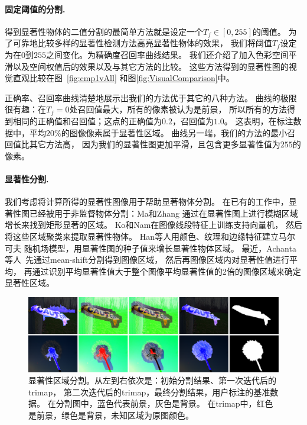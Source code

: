 \documentclass[final]{cvpr}
\newcommand{\mypara}[1]{\paragraph{#1.}}
\begin{document}

\mypara{固定阈值的分割}
得到显著性物体的二值分割的最简单方法就是设定一个$T_f \in [0, 255]$的阈值。
为了可靠地比较多样的显著性检测方法高亮显著性物体的效果，
我们将阈值$T_f$设定为在$0$到$255$之间变化。为精确度召回率曲线结果。
我们还介绍了加入色彩空间平滑以及空间权值后的效果以及与其它方法的比较。
这些方法得到的显著性图的视觉直观比较在图~\ref{fig:cmp1vAll}
和图\ref{fig:VisualComparison}中。

正确率、召回率曲线清楚地展示出我们的方法优于其它的八种方法。
曲线的极限很有趣：在$T_f=0$处召回值最大，所有的像素被认为是前景，
所以所有的方法得到相同的正确值和召回值；这点的正确值为$0.2$，召回值为$1.0$。
这表明，在标注数据中，平均$20\%$的图像像素属于显著性区域。
曲线另一端，我们的方法的最小召回值比其它方法高，
因为我们的显著性图更加平滑，且包含更多显著性值为$255$的像素。


\mypara{显著性分割}
我们考虑将计算所得的显著性图像用于帮助显著物体分割。
在已有的工作中，显著性图已经被用于非监督物体分割：Ma和Zhang\cite{03ACMMM/Ma_Contrast-based}
通过在显著性图上进行模糊区域增长来找到矩形显著的区域。
Ko和Nam\cite{06josa/KoN_InterestSegmentation}在图像线段特征上训练支持向量机，
然后将这些区域聚类来提取显著性物体。
Han等人\cite{06TCSVT/han_unsupervised}用颜色、纹理和边缘特征建立马尔可夫
随机场模型，用显著性图的种子值来增长显著性物体区域。
最近，Achanta 等人~\cite{09cvpr/Achanta_FTSaliency}先通过mean-shift分割得到图像区域，
然后再图像区域内对显著性值进行平均，
再通过识别平均显著性值大于整个图像平均显著性值的2倍的图像区域来确定显著性区域。

\begin{figure}[b]
    \includegraphics[width=\columnwidth]{saliency_cut.pdf}
    \caption{显著性区域分割。从左到右依次是：初始分割结果、第一次迭代后的trimap，
          第二次迭代后的trimap，最终分割结果，用户标注的基准数据。
          在分割图中，蓝色代表前景，灰色是背景。
          在trimap中，红色是前景，绿色是背景，未知区域为原图颜色。
    }\label{fig:AttCutSteps}
\end{figure}
\end{document}
